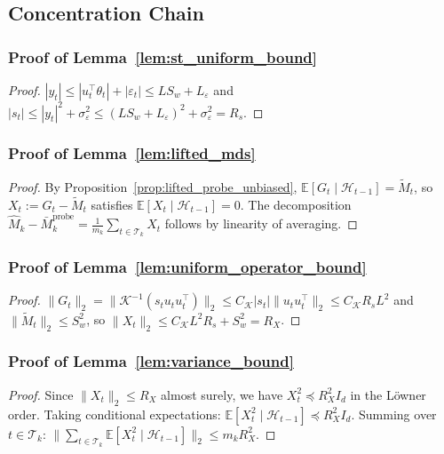 \documentclass{article}
\newcommand{\E}{\mathbb{E}}
\newcommand{\cH}{\mathcal{H}}
\newcommand{\cT}{\mathcal{T}}
\begin{document}
\subsection{Concentration Chain}

\subsubsection{Proof of Lemma~\ref{lem:st_uniform_bound}}
\label{proof:st_uniform_bound}

\begin{proof}
$|y_t| \le |u_t^\top \theta_t| + |\varepsilon_t| \le LS_w + L_\varepsilon$ and $|s_t| \le |y_t|^2 + \sigma_\varepsilon^2 \le (LS_w + L_\varepsilon)^2 + \sigma_\varepsilon^2 = R_s$.
\end{proof}

\subsubsection{Proof of Lemma~\ref{lem:lifted_mds}}
\label{proof:lifted_mds}

\begin{proof}
By Proposition~\ref{prop:lifted_probe_unbiased}, $\E[G_t \mid \cH_{t-1}] = \widetilde{M}_t$, so $X_t := G_t - \widetilde{M}_t$ satisfies $\E[X_t \mid \cH_{t-1}] = 0$.
The decomposition $\widehat{M}_k - \bar{M}_k^{\mathrm{probe}} = \frac{1}{m_k}\sum_{t \in \cT_k} X_t$ follows by linearity of averaging.
\end{proof}

\subsubsection{Proof of Lemma~\ref{lem:uniform_operator_bound}}
\label{proof:uniform_operator_bound}

\begin{proof}
$\|G_t\|_2 = \|\mathcal K^{-1}(s_t u_t u_t^\top)\|_2 \le C_{\mathcal K} |s_t| \|u_t u_t^\top\|_2 \le C_{\mathcal K} R_s L^2$ and $\|\widetilde{M}_t\|_2 \le S_w^2$, so $\|X_t\|_2 \le C_{\mathcal K} L^2 R_s + S_w^2 = R_X$.
\end{proof}

\subsubsection{Proof of Lemma~\ref{lem:variance_bound}}
\label{proof:variance_bound}

\begin{proof}
Since $\|X_t\|_2 \le R_X$ almost surely, we have $X_t^2 \preceq R_X^2 I_d$ in the L\"owner order.
Taking conditional expectations: $\E[X_t^2 \mid \cH_{t-1}] \preceq R_X^2 I_d$.
Summing over $t \in \cT_k$: $\|\sum_{t \in \cT_k} \E[X_t^2 \mid \cH_{t-1}]\|_2 \le m_k R_X^2$.
\end{proof}
\end{document}
